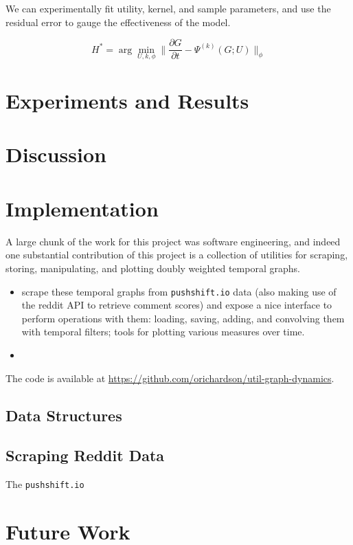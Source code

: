 \documentclass{article}
\theoremstyle{definition}
\begin{document}
	We can experimentally fit utility, kernel, and sample parameters, and use the residual error to gauge the effectiveness of the model.
	
	\[ H^* = \arg\min_{U,k,\phi} \Big\lVert \frac{\partial G}{\partial t} - \Psi^{(k)}(G;U)  \Big\rVert_\phi \]
	
	\section{Experiments and Results}
	
	\section{Discussion}
	
	\section{Implementation}
	A large chunk of the work for this project was software engineering, and indeed one substantial contribution of this project is a collection of utilities for scraping, storing, manipulating, and plotting doubly weighted temporal graphs.
	
	\begin{itemize}
		\item scrape these temporal graphs from \texttt{pushshift.io} data (also making use of the reddit API to retrieve comment scores) and expose a nice interface to perform operations with them: loading, saving, adding, and convolving them with temporal filters; tools for plotting various measures over time.
		
		\item 
	\end{itemize}
	
	
	The code is available at \url{https://github.com/orichardson/util-graph-dynamics}. 
	
	\subsection{Data Structures}
	
	\subsection{Scraping Reddit Data}
	The \texttt{pushshift.io}
	
	\section{Future Work}
	
\end{document}
